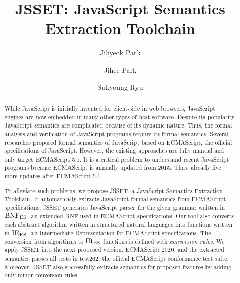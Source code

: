 \documentclass[sigconf,review,anonymous=true]{acmart}
\begin{document}
\title{JSSET: JavaScript Semantics Extraction Toolchain}

\author{Jihyeok Park}

\author{Jihee Park}

\author{Sukyoung Ryu}

\begin{abstract}
While JavaScript is initially invented for client-side in web browsers,
JavaScript engines are now embedded in many other types of host software.
Despite its popularity, JavaScript semantics are complicated because of its
dynamic nature. Thus, the formal analysis and verification of JavaScript programs
require its formal semantics. Several researches proposed formal semantics
of JavaScript based on ECMAScript, the official specifications of JavaScript.
However, the existing approaches are fully manual and only target ECMAScript 5.1.
It is a critical problem to understand recent JavaScript programs
because ECMAScript is annually updated from 2015. Thus, already five more updates
after ECMAScript 5.1.

To alleviate such problems, we propose JSSET, a JavaScript Semantics Extraction
Toolchain. It automatically extracts JavaScript formal semantics from ECMAScript
specifications. JSSET generates JavaScript parser for the given grammar written
in \( \text{BNF}_{\text{ES}} \), an extended BNF used in ECMAScript specifications.
Our tool also converts each abstract algorithm written in structured natural
languages into functions written in \( \text{IR}_\text{ES} \), an Intermediate Representation
for ECMAScript specifications. The conversion from algorithms to \( \text{IR}_\text{ES} \) functions
is defined with \textit{conversion rules}. We apply JSSET into the next proposed
version, ECMAScript 2020. and the extracted semantics passes all  tests
in test262, the official ECMAScript conformance test suite.
Moreover, JSSET also successfully extracts semantics for  proposed features
by adding only  minor conversion rules.
\end{abstract}


\maketitle












\end{document}
